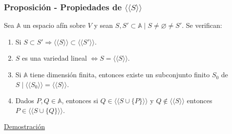 \documentclass[12pt, a4paper, ones, notitlepage, openany,titlepage]{article}
\newcommand{\demostracion}{\noindent\underline{Demostración}}
\begin{document}
\subsubsection{Proposición - Propiedades de $\langle\langle S\rangle\rangle$}
\noindent Sea $\mathbb{A}$ un espacio afín sobre $V$ y sean $S, S' \subset \mathbb{A} \mid S \neq \varnothing \neq S'$. Se verifican:
\begin{enumerate}[label=(\alph*)]
	\item Si $S \subset S' \Longrightarrow \langle\langle S \rangle\rangle \subset \langle\langle S' \rangle\rangle$.
	\item $S$ es una variedad lineal $\Longleftrightarrow S = \langle\langle S \rangle\rangle$.
	\item Si $\mathbb{A}$ tiene dimensión finita, entonces existe un subconjunto finito $S_0$ de $S \mid \langle\langle S_0 \rangle\rangle = \langle\langle S \rangle\rangle$.
	\item Dados $P, Q \in \mathbb{A}$, entonces si $Q \in \langle\langle S \cup \{P\} \rangle\rangle$ y $Q \notin \langle\langle S \rangle\rangle$ entonces $P \in \langle\langle S \cup \{Q\}\rangle\rangle$.
\end{enumerate}
\demostracion
\end{document}
